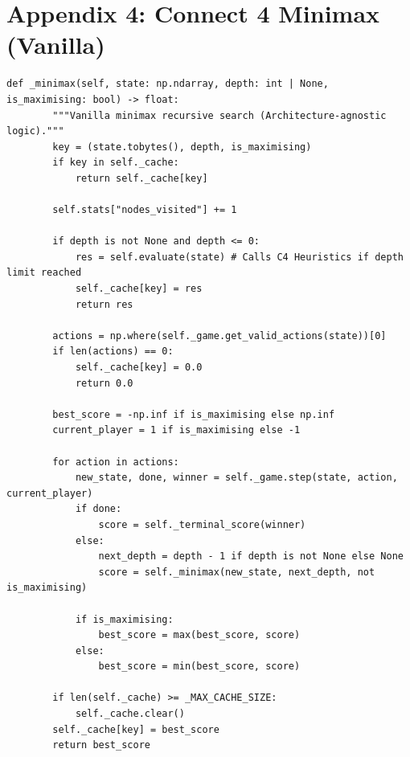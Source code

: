 \section{Appendix 4: Connect 4 Minimax (Vanilla)}
{\small
\begin{lstlisting}[style=mypython]
    def _minimax(self, state: np.ndarray, depth: int | None, is_maximising: bool) -> float:
        """Vanilla minimax recursive search (Architecture-agnostic logic)."""
        key = (state.tobytes(), depth, is_maximising)
        if key in self._cache:
            return self._cache[key]
            
        self.stats["nodes_visited"] += 1

        if depth is not None and depth <= 0:
            res = self.evaluate(state) # Calls C4 Heuristics if depth limit reached
            self._cache[key] = res
            return res

        actions = np.where(self._game.get_valid_actions(state))[0]
        if len(actions) == 0:
            self._cache[key] = 0.0
            return 0.0

        best_score = -np.inf if is_maximising else np.inf
        current_player = 1 if is_maximising else -1
        
        for action in actions:
            new_state, done, winner = self._game.step(state, action, current_player)
            if done:
                score = self._terminal_score(winner)
            else:
                next_depth = depth - 1 if depth is not None else None
                score = self._minimax(new_state, next_depth, not is_maximising)
            
            if is_maximising:
                best_score = max(best_score, score)
            else:
                best_score = min(best_score, score)
                
        if len(self._cache) >= _MAX_CACHE_SIZE:
            self._cache.clear()
        self._cache[key] = best_score
        return best_score
\end{lstlisting}
}

